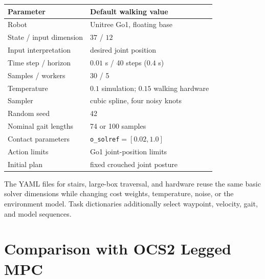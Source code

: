 \documentclass[11pt,a4paper]{article}
\newcommand{\code}[1]{\texttt{#1}}
\begin{document}
\begin{center}
\begin{tabular}{ll}
\toprule
Parameter & Default walking value\\
\midrule
Robot & Unitree Go1, floating base\\
State / input dimension & $37$ / $12$\\
Input interpretation & desired joint position\\
Time step / horizon & $0.01$ s / 40 steps ($0.4$ s)\\
Samples / workers & 30 / 5\\
Temperature & $0.1$ simulation; $0.15$ walking hardware\\
Sampler & cubic spline, four noisy knots\\
Random seed & 42\\
Nominal gait lengths & 74 or 100 samples\\
Contact parameters & \code{o\_solref}$=[0.02,1.0]$\\
Action limits & Go1 joint-position limits\\
Initial plan & fixed crouched joint posture\\
\bottomrule
\end{tabular}
\end{center}

The YAML files for stairs, large-box traversal, and hardware reuse the same
basic solver dimensions while changing cost weights, temperature, noise, or
the environment model.  Task dictionaries additionally select waypoint,
velocity, gait, and model sequences.

\section{Comparison with OCS2 Legged MPC}
\end{document}
